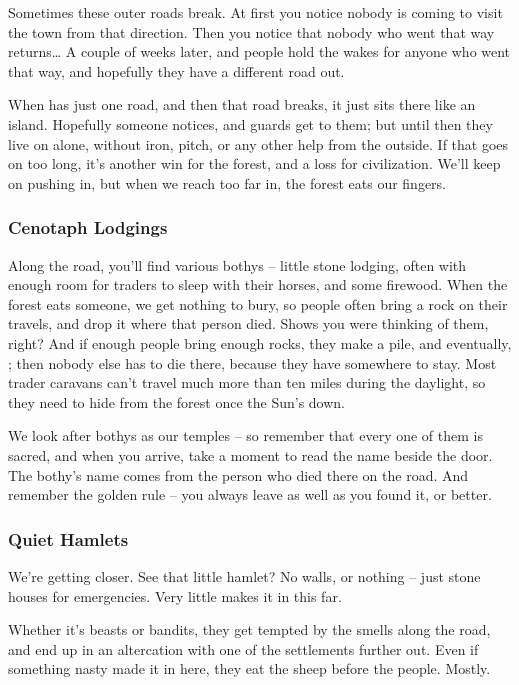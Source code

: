 \begin{multicols}{2}
\begin{exampletext}
  Sometimes these outer roads break.
  At first you notice nobody is coming to visit the town from that direction.
  Then you notice that nobody who went that way returns\ldots
  A couple of weeks later, and people hold the wakes for anyone who went that way, and hopefully they have a different road out.

  When  has just one road, and then that road breaks, it just sits there like an island.
  Hopefully someone notices, and \glspl{guard} get to them; but until then they live on alone, without iron, pitch, or any other help from the outside.
  If that goes on too long, it's another win for the forest, and a loss for civilization.
  We'll keep on pushing in, but when we reach too far in, the forest eats our fingers.

  \subsubsection*{Cenotaph Lodgings}

  Along the road, you'll find various \glspl{bothy} -- little stone lodging, often with enough room for traders to sleep with their horses, and some firewood.
  When the forest eats someone, we get nothing to bury, so people often bring a rock on their travels, and drop it where that person died.
  Shows you were thinking of them, right?
  And if enough people bring enough rocks, they make a pile, and eventually, ; then nobody else has to die there, because they have somewhere to stay.
  Most trader caravans can't travel much more than ten miles during the daylight, so they need  to hide from the forest once the Sun's down.

  We look after \glspl{bothy} as our temples -- so remember that every one of them is sacred, and when you arrive, take a moment to read the name beside the door.
  The \gls{bothy}'s name comes from the person who died there on the road.
  And remember the golden rule -- you always leave  as well as you found it, or better.

  \subsubsection*{Quiet Hamlets}

  We're getting closer.
  See that little hamlet?
  No walls, or nothing -- just stone houses for emergencies.
  Very little makes it in this far.

  Whether it's beasts or bandits, they get tempted by the smells along the road, and end up in an altercation with one of the settlements further out.
  Even if something nasty made it in here, they eat the sheep before the people.
  Mostly.


\end{exampletext}
\end{multicols}
